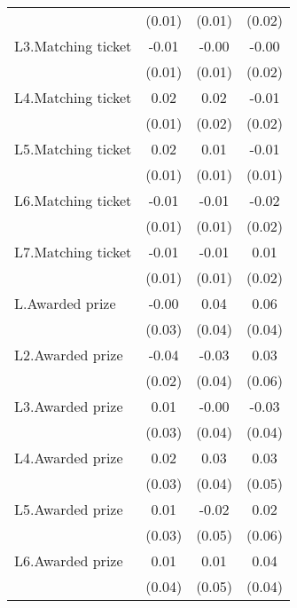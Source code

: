 \begin{table}[h]
{\begin{threeparttable}
\begin{tabular}{l*{3}{c}}
                &   (0.01)         &   (0.01)         &   (0.02)         \\
L3.Matching ticket&    -0.01         &    -0.00         &    -0.00         \\
                &   (0.01)         &   (0.01)         &   (0.02)         \\
L4.Matching ticket&     0.02\sym{*}  &     0.02         &    -0.01         \\
                &   (0.01)         &   (0.02)         &   (0.02)         \\
L5.Matching ticket&     0.02         &     0.01         &    -0.01         \\
                &   (0.01)         &   (0.01)         &   (0.01)         \\
L6.Matching ticket&    -0.01         &    -0.01         &    -0.02         \\
                &   (0.01)         &   (0.01)         &   (0.02)         \\
L7.Matching ticket&    -0.01         &    -0.01         &     0.01         \\
                &   (0.01)         &   (0.01)         &   (0.02)         \\
L.Awarded prize &    -0.00         &     0.04         &     0.06         \\
                &   (0.03)         &   (0.04)         &   (0.04)         \\
L2.Awarded prize&    -0.04\sym{*}  &    -0.03         &     0.03         \\
                &   (0.02)         &   (0.04)         &   (0.06)         \\
L3.Awarded prize&     0.01         &    -0.00         &    -0.03         \\
                &   (0.03)         &   (0.04)         &   (0.04)         \\
L4.Awarded prize&     0.02         &     0.03         &     0.03         \\
                &   (0.03)         &   (0.04)         &   (0.05)         \\
L5.Awarded prize&     0.01         &    -0.02         &     0.02         \\
                &   (0.03)         &   (0.05)         &   (0.06)         \\
L6.Awarded prize&     0.01         &     0.01         &     0.04         \\
                &   (0.04)         &   (0.05)         &   (0.04)         \\

\end{tabular}
\end{threeparttable}}
\end{table}
